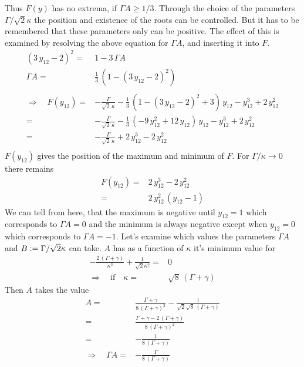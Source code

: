 \documentclass{article}
\begin{document}
Thus $F(y)$ has no extrema, if $\Gamma A\geq1/3$. Through the choice of the parameters $\Gamma/\sqrt{2}\kappa$ the position and existence of the roots can be controlled. But it has to be remembered that these parameters only can be positive. The effect of this is examined by resolving the above equation for $\Gamma A$, and inserting it into $F$.
\begin{align*}
    (3\,y_{12}-2)^2=&1-3\,\Gamma A\\
    \Gamma A=& \frac{1}{3}\,\left(  1-(3\,y_{12}-2)^2 \right)\\\\
    \Rightarrow\quad F(y_{12})=&-\frac{\Gamma}{\sqrt{2}\,\kappa}-\frac{1}{3}\,\left(  1-(3\,y_{12}-2)^2 +3\right)\,y_{12}-y_{12}^3+2\,y_{12}^2\\
    =&-\frac{\Gamma}{\sqrt{2}\,\kappa}-\frac{1}{3}\,\left( - 9\,y_{12}^2+12\,y_{12}\right)\,y_{12}-y_{12}^3+2\,y_{12}^2\\
    =&-\frac{\Gamma}{\sqrt{2}\,\kappa}+2\,y_{12}^3-2\,y_{12}^2\\
\end{align*}
$F(y_{12})$ gives the position of the maximum and minimum of $F$. For $\Gamma/\kappa\rightarrow0$ there remains
\begin{align*}
    F(y_{12})=&2\,y_{12}^3-2\,y_{12}^2\\
    =&2\,y_{12}^2\,(y_{12}-1)
\end{align*}
We can tell from here, that the maximum is negative until $y_{12}=1$ which corresponds to $\Gamma A =0$ and the minimum is always negative except when $y_{12}=0$ which corresponds to $\Gamma A=-1$. Let's examine which values the parameters $\Gamma A$ and $B\vcentcolon=\Gamma/\sqrt{2}\kappa$ can take. $A$ has as a function of $\kappa$ it's minimum value for
\begin{align*}
    -\frac{2\,(\Gamma+\gamma)}{\kappa^3}+\frac{1}{\sqrt{2}\kappa^2}=&0\\
    \Rightarrow\quad\text{if}\quad \kappa=&\sqrt{8}\,(\Gamma+\gamma)
\end{align*}
Then $A$ takes the value
\begin{align*}
    A=&\frac{\Gamma+\gamma}{8\,(\Gamma+\gamma)^2}-\frac{1}{\sqrt{2}\sqrt{8}\,(\Gamma+\gamma)}\\
    =&\frac{\Gamma+\gamma-2\,(\Gamma+\gamma)}{8\,(\Gamma+\gamma)^2}\\
    =&-\frac{1}{8\,(\Gamma+\gamma)}\\
    \Rightarrow\quad \Gamma A=&-\frac{\Gamma}{8\,(\Gamma+\gamma)}
\end{align*}
\end{document}
